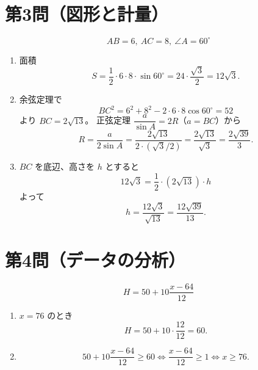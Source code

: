 \documentclass[a4paper,12pt]{ltjsarticle}
\begin{document}
\section*{第3問（図形と計量）}
\[
AB=6,\ AC=8,\ \angle A=60^\circ
\]
\begin{enumerate}[label=\arabic*.]
  \item 面積
  \[
  S=\frac12\cdot6\cdot8\cdot\sin60^\circ
  =24\cdot\frac{\sqrt3}{2}
  =12\sqrt3.
  \]
  \item 余弦定理で
  \[
  BC^2=6^2+8^2-2\cdot6\cdot8\cos60^\circ=52
  \]
  より \(BC=2\sqrt{13}\)。  
  正弦定理 \( \dfrac{a}{\sin A}=2R \)（\(a=BC\)）から
  \[
  R=\frac{a}{2\sin A}
  =\frac{2\sqrt{13}}{2\cdot(\sqrt3/2)}
  =\frac{2\sqrt{13}}{\sqrt3}
  =\frac{2\sqrt{39}}{3}.
  \]
  \item \(BC\) を底辺、高さを \(h\) とすると
  \[
  12\sqrt3=\frac12\cdot(2\sqrt{13})\cdot h
  \]
  よって
  \[
  h=\frac{12\sqrt3}{\sqrt{13}}
  =\frac{12\sqrt{39}}{13}.
  \]
\end{enumerate}

\section*{第4問（データの分析）}
\[
H=50+10\frac{x-64}{12}
\]
\begin{enumerate}[label=\arabic*.]
  \item \(x=76\) のとき
  \[
  H=50+10\cdot\frac{12}{12}=60.
  \]
  \item
  \[
  50+10\frac{x-64}{12}\ge60
  \iff \frac{x-64}{12}\ge1
  \iff x\ge76.
  \]
\end{enumerate}
\end{document}
